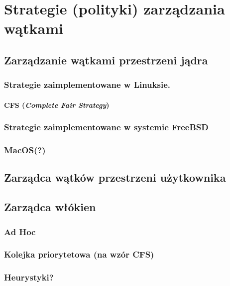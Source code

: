 \section{Strategie (polityki) zarządzania wątkami}

\subsection{Zarządzanie wątkami przestrzeni jądra}

\subsubsection{Strategie zaimplementowane w Linuksie.}

\paragraph{CFS (\emph{Complete Fair Strategy})}

\subsubsection{Strategie zaimplementowane w systemie FreeBSD}

\subsubsection{MacOS(?)}

\subsection{Zarządca wątków przestrzeni użytkownika}

\subsection{Zarządca włókien}

\subsubsection{Ad Hoc}

\subsubsection{Kolejka priorytetowa (na wzór CFS)}

\subsubsection{Heurystyki?}
